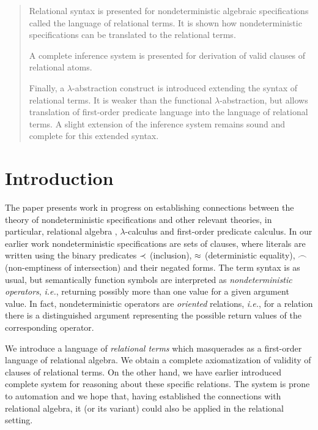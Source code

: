 \pagestyle{empty}

\noindent\maketitle
\thispagestyle{empty}
\begin{abstract}
Relational syntax is presented for nondeterministic algebraic specifications
called the language of relational terms.  It is shown how nondeterministic
specifications can be translated to the relational terms.

A complete inference system is presented for derivation of valid clauses of
relational atoms.

Finally, a $\lambda $-abstraction construct is introduced extending the
syntax of relational terms.  It is weaker than the functional $\lambda
$-abstraction, but allows translation of first-order predicate language into
the language of relational terms. A slight extension of the inference system
remains sound and complete for this extended syntax.
\end{abstract}

\section*{Introduction}
 
The paper presents work in progress on establishing connections between the
theory of nondeterministic specifications and other relevant theories, in
particular, relational algebra \cite{RelTh}, $\lambda$-calculus and
first-order predicate calculus.  In our earlier work \cite{KW-nong,MW-II,MW}
nondeterministic specifications are sets of clauses, where literals are
written using the binary predicates $\mathbin{\prec}$ (inclusion), $\mathbin{\approx}$ (deterministic
equality), $\mathbin{\frown}$ (non-emptiness of intersection) and their negated forms.
The term syntax is as usual, but semantically function symbols are
interpreted as {\em nondeterministic operators}, {\it i.e.}, returning
possibly more than one value for a given argument value.  In fact,
nondeterministic operators are {\em oriented} relations, {\it i.e.}, for a
relation there is a distinguished argument representing the possible return
values of the corresponding operator.

We introduce a language of {\em relational terms} which masquerades as a
first-order language of relational algebra. We obtain a complete
axiomatization of validity of clauses of relational terms.  On the other
hand, we have earlier introduced \cite {KW-nong} complete system for
reasoning about these specific relations.
The system is prone to automation and we hope that,
having established the connections with relational algebra, it (or its
variant) could also be applied in the relational setting.

